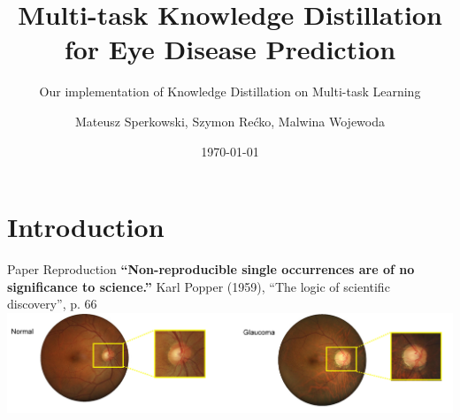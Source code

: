 \documentclass [xcolor=svgnames, t] {beamer}
\title[MTKD Presentation]{Multi-task Knowledge Distillation for Eye Disease Prediction}
\subtitle{Our implementation of Knowledge Distillation on Multi-task Learning}
\author[Warsztaty Badawcze 2022L]{
	Mateusz Sperkowski, Szymon Rećko, Malwina Wojewoda}
\date{\today}
\begin{document}
{
\begin{frame}[plain]
\end{frame}
}

\begin{frame}
\maketitle
\end{frame}



\section{Introduction}
\begin{frame}{Paper Reproduction}
\centering
\textbf{\small “Non-reproducible single occurrences are of no significance to
science.”} 
{\footnotesize Karl Popper (1959), “The logic of scientific discovery”, p. 66}\\
\vspace{7mm}
\includegraphics[width=\linewidth]{eye.png}
\vspace{5mm}
{\small \vspace{-2em} }
\end{frame}
\end{document}
